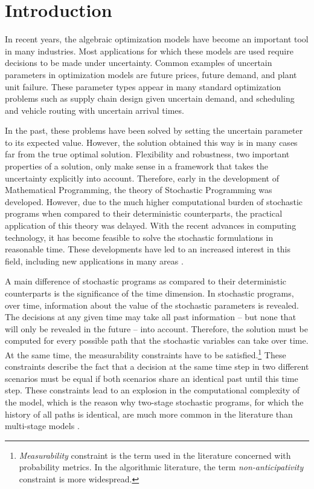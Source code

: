 \section{Introduction}
In recent years, the algebraic optimization models have become an important tool in many industries.
Most applications for which these models are used require decisions to be made under uncertainty.
Common examples of uncertain parameters in optimization models are future prices, future demand, and plant unit failure.
These parameter types appear in many standard optimization problems such as supply chain design given uncertain demand, and scheduling and vehicle routing with uncertain arrival times.

In the past, these problems have been solved by setting the uncertain parameter to its expected value.
However, the solution obtained this way is in many cases far from the true optimal solution.
Flexibility and robustness, two important properties of a solution, only make sense in a framework that takes the uncertainty explicitly into account.
Therefore, early in the development of Mathematical Programming, the theory of Stochastic Programming was developed.
However, due to the much higher computational burden of stochastic programs when compared to their deterministic counterparts, the practical application of this theory was delayed.
With the recent advances in computing technology, it has become feasible to solve the stochastic formulations in reasonable time.
These developments have led to an increased interest in this field, including new applications in many areas \citep{Birge1997a,Sahinidis2004}.

A main difference of stochastic programs as compared to their deterministic counterparts is the significance of the time dimension.
In stochastic programs, over time, information about the value of the stochastic parameters is revealed.
The decisions at any given time may take all past information -- but none that will only be revealed in the future -- into account.
Therefore, the solution must be computed for every possible path that the stochastic variables can take over time.
At the same time, the measurability constraints have to be satisfied.\footnote{\textit{Measurability} constraint is the term used in the literature concerned with probability metrics. In the algorithmic literature, the term \textit{non-anticipativity} constraint is more widespread.}
These constraints describe the fact that a decision at the same time step in two different scenarios must be equal if both scenarios share an identical past until this time step.
These constraints lead to an explosion in the computational complexity of the model, which is the reason why two-stage stochastic programs, for which the history of all paths is identical, are much more common in the literature than multi-stage models \citep{Shapiro2005}.

